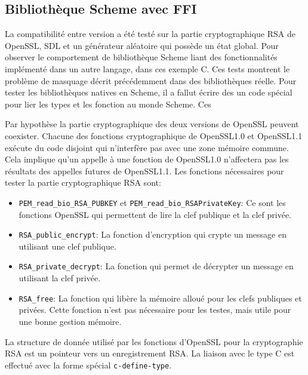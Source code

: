 

\clearpage
\subsection{Bibliothèque Scheme avec FFI}
La compatibilité entre version a été testé sur la partie cryptographique
RSA de OpenSSL, SDL et un générateur aléatoire qui possède un état global.
Pour observer le comportement de bibliothèque Scheme liant des fonctionnalités
implémenté dans un autre langage, dans ces exemple C. Ces tests montrent le problème
de masquage décrit précédemment dans des bibliothèques réelle.
Pour tester les bibliothèques natives en Scheme, il a fallut écrire des
un code spécial pour lier les types et les fonction au monde Scheme. Ces

Par hypothèse la partie cryptographique des deux versions de OpenSSL peuvent
coexister. Chacune des fonctions cryptographique de OpenSSL1.0 et OpenSSL1.1
exécute du code disjoint qui n'interfère pas avec une zone mémoire commune.
Cela implique qu'un appelle à une fonction de OpenSSL1.0 n'affectera pas les
résultats des appelles futures de OpenSSL1.1. Les fonctions nécessaires
pour tester la partie cryptographique RSA sont:
\begin{itemize}
    \item \lstinline{PEM_read_bio_RSA_PUBKEY} et \lstinline{PEM_read_bio_RSAPrivateKey}:
        Ce sont les fonctions OpenSSL qui permettent de lire la clef publique et la clef privée.
    \item \lstinline{RSA_public_encrypt}:
        La fonction d'encryption qui crypte un  message en utilisant une clef publique.
    \item \lstinline{RSA_private_decrypt}:
        La fonction qui permet de décrypter un message en utilisant la clef privée.
    \item \lstinline{RSA_free}:
        La fonction qui libère la mémoire alloué pour les clefs publiques et privées.
        Cette fonction n'est pas nécessaire pour les testes, mais utile pour une bonne
        gestion mémoire.
\end{itemize}
La structure de donnée utilisé par les fonctions d'OpenSSL pour la cryptographie RSA
est un pointeur vers un enregistrement RSA. La liaison avec le type C est effectué avec
la forme spécial \lstinline{c-define-type}.

